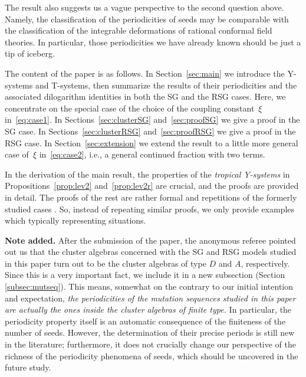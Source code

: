 \documentclass[pdftex]{sigma}
\numberwithin{equation}{section}
\theoremstyle{definition}
\begin{document}
The result also suggests us a vague perspective
to the second question above.
Namely, the classif\/ication of the periodicities of seeds
may be comparable with the classif\/ication
of the integrable deformations
of rational conformal f\/ield theories.
In particular, those periodicities
we have already known should be just a tip of iceberg.

The content of the paper is as follows.
In Section~\ref{sec:main} we introduce
the Y-systems and T-systems,
then summarize the results of their periodicities
and the associated dilogarithm identities
in both the SG and the RSG cases.
Here, we concentrate on the special case
of the choice of the coupling constant~$\xi$ in~\eqref{eq:case1}.
In Sections~\ref{sec:clusterSG} and~\ref{sec:proofSG}
we give a proof in the SG case.
In Sections~\ref{sec:clusterRSG} and~\ref{sec:proofRSG}
we give a proof in the RSG case.
In Section~\ref{sec:extension}
we extend the result to a little more
general case of~$\xi$ in~\eqref{eq:case2},
i.e., a general continued fraction with two terms.

In the derivation of the main result,
the properties of the {\em tropical Y-systems\/} in
Propositions~\ref{prop:lev2} and~\ref{prop:lev2r}
are crucial, and the proofs are provided
in detail.
The proofs of the rest are rather formal and
repetitions of the formerly studied cases
 \cite{Keller08,Inoue10c,
Nakanishi09,Keller10,Inoue10a,Inoue10b}.
So, instead of repeating similar proofs, we only provide
examples which typically representing
situations.

{\bf Note added.} After the submission of  the paper,
the anonymous referee pointed out us that
the cluster algebras concerned with the SG and
RSG models studied in this paper
 turn out to be the cluster algebras of type $D$ and $A$,
respectively.
Since this is a very important fact, we include it
in a new subsection (Section \ref{subsec:mutseq}).
This means,
somewhat on the contrary to our initial intention and
expectation,
{\em the periodicities of the mutation sequences
studied in this paper are
actually the ones inside the cluster algebras of finite type.}
In particular, the periodicity property itself
is an automatic consequence of the f\/initeness of the number of seeds.
However, the determination of their
precise periods is still  new in the literature;
furthermore, it does not crucially change our perspective of the
richness of the periodicity phenomena of seeds, which should
be uncovered in the future study.
\end{document}
